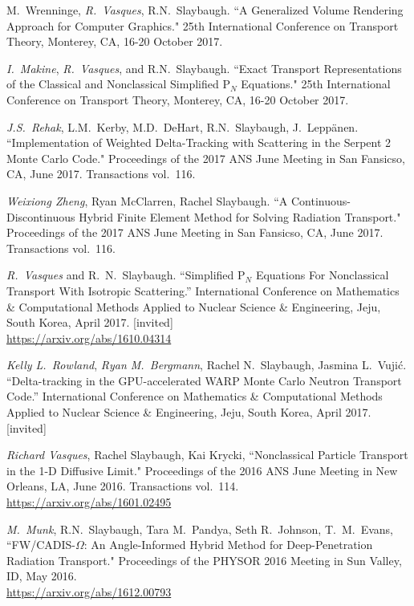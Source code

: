 \begin{bibsection}
\item M.\ Wrenninge, \textit{R.\ Vasques}, R.N.\ Slaybaugh. ``A Generalized Volume Rendering Approach for Computer Graphics." 25th International Conference on Transport Theory, Monterey, CA, 16-20 October 2017.

\item  \textit{I.\ Makine}, \textit{R.\ Vasques}, and R.N.\ Slaybaugh. ``Exact Transport Representations of the Classical and Nonclassical Simplified P$_N$ Equations." 25th International Conference on Transport Theory, Monterey, CA, 16-20 October 2017.

\item \textit{J.S.\ Rehak}, L.M.\ Kerby, M.D.\ DeHart, R.N.\ Slaybaugh, J.\ Lepp\"{a}nen. ``Implementation of Weighted Delta-Tracking with Scattering in the Serpent 2 Monte Carlo Code." Proceedings of the 2017 ANS June Meeting in San Fansicso, CA, June 2017. Transactions vol.\ 116.

\item\textit{ Weixiong Zheng}, Ryan McClarren, Rachel Slaybaugh. ``A Continuous-Discontinuous Hybrid Finite Element Method for Solving Radiation Transport." Proceedings of the 2017 ANS June Meeting in San Fansicso, CA, June 2017. Transactions vol.\ 116.

\item \textit{R.\ Vasques} and R.\ N.\ Slaybaugh. ``Simplified P$_N$ Equations For Nonclassical Transport With Isotropic Scattering.'' International Conference on Mathematics \& Computational Methods Applied to Nuclear Science \& Engineering, Jeju, South Korea, April 2017. [invited]\\
\url{https://arxiv.org/abs/1610.04314}

\item \textit{Kelly L.\ Rowland}, \textit{Ryan M.\ Bergmann}, Rachel N.\ Slaybaugh, Jasmina L.\ Vuji\'c. ``Delta-tracking in the GPU-accelerated WARP Monte Carlo Neutron Transport Code.'' International Conference on Mathematics \& Computational Methods Applied to Nuclear Science \& Engineering, Jeju, South Korea, April 2017. [invited]

\item \textit{Richard Vasques}, Rachel Slaybaugh, Kai Krycki, ``Nonclassical Particle Transport in the 1-D Diffusive Limit." Proceedings of the 2016 ANS June Meeting in New Orleans, LA, June 2016. Transactions vol.\ 114.\\
\url{https://arxiv.org/abs/1601.02495}

\item \textit{M.\ Munk}, R.N.\ Slaybaugh, Tara M.~Pandya, Seth R.~Johnson, T.~M.~Evans, ``FW/CADIS-$\Omega$: An Angle-Informed Hybrid Method for Deep-Penetration Radiation Transport." Proceedings of the PHYSOR 2016 Meeting in Sun Valley, ID, May 2016.\\
\url{https://arxiv.org/abs/1612.00793}


\end{bibsection}
